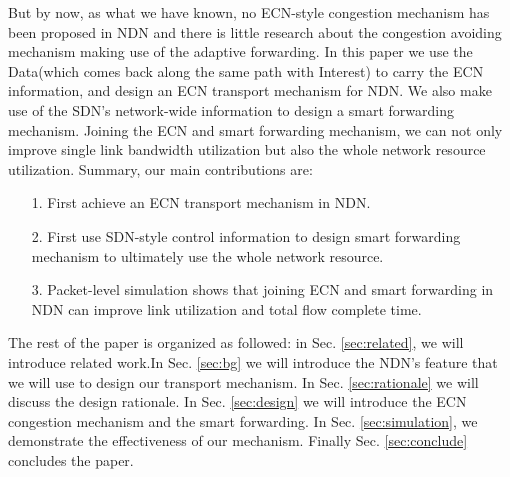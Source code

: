 But by now, as what we have known, no ECN-style congestion mechanism has been proposed in NDN and there is little research about the congestion avoiding mechanism making use of the adaptive forwarding. In this paper we use the Data(which comes back along the same path with Interest) to carry the ECN information, and design an ECN transport mechanism for NDN. We also make use of the SDN's network-wide information to design a smart forwarding mechanism. Joining the ECN and smart forwarding mechanism, we can not only improve single link bandwidth utilization but also the whole network resource utilization. Summary, our main contributions are:

\begin{enumerate}
\item[1.] First achieve an ECN transport mechanism in NDN.
\item[2.] First use SDN-style control information to design smart forwarding mechanism to ultimately use the whole network resource.
\item[3.] Packet-level simulation shows that joining ECN and smart forwarding in NDN can improve link utilization and total flow complete time.
\end{enumerate}

The rest of the paper is organized as followed: in Sec. \ref{sec:related}, we will introduce related work.In Sec. \ref{sec:bg} we will introduce the NDN's feature that we will use to design our transport mechanism. In Sec. \ref{sec:rationale} we will discuss the design rationale. In Sec. \ref{sec:design} we will introduce the ECN congestion mechanism and the smart forwarding. In Sec. \ref{sec:simulation}, we demonstrate the effectiveness of our mechanism.  Finally Sec. \ref{sec:conclude} concludes the paper.


